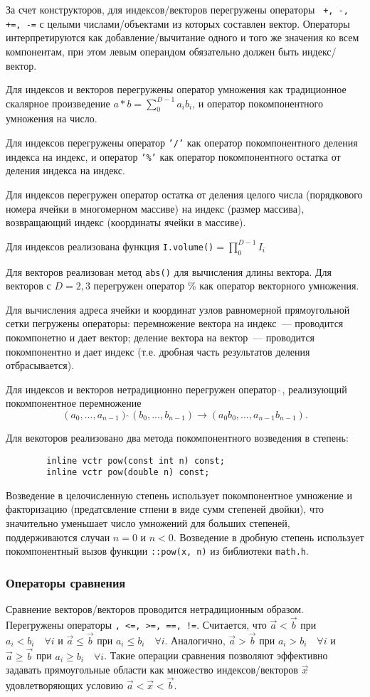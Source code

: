 За счет конструкторов, для индексов/векторов перегружены операторы {\tt
  +, -, +=, -=} с целыми  числами/объектами из которых составлен вектор. Операторы интерпретируются как
добавление/вычитание одного и того же значения ко всем компонентам, при этом левым операндом обязательно должен быть индекс/вектор.

Для индексов и векторов перегружены оператор умножения как традиционное
скалярное произведение {\tt $a\ast
  b=\sum_{0}^{D-1} a_ib_i$}, и оператор покомпонентного умножения на число. 

Для индексов перегружены оператор {\tt '/'} как оператор покомпонентного деления индекса на индекс, и
оператор {\tt '\%'} как оператор покомпонентного остатка от деления индекса на индекс.

Для индексов перегружен оператор остатка от деления целого числа (порядкового номера
ячейки в многомерном массиве) на индекс
(размер массива), возвращающий индекс (координаты ячейки в массиве).

Для индексов реализована функция {\tt I.volume()$=\prod_{0}^{D-1} I_i$}

Для векторов реализован метод {\tt abs()} для вычисления
длины вектора. Для векторов с $D=2,3$ перегружен оператор \% как оператор
векторного умножения. 

Для вычисления адреса ячейки и координат узлов
равномерной прямоугольной сетки  пегружены операторы:
перемножение вектора на индекс~---
проводится покомпонетно и дает вектор; деление вектора на вектор~---
проводится покомпонентно и дает индекс (т.е. дробная часть результатов деления
отбрасывается). 

Для индексов и векторов нетрадиционно перегружен оператор $\widehat{~}$, 
реализующий покомпонентное перемножение
$$(a_0,...,a_{n-1})\widehat{~}(b_0,...,b_{n-1}) \to (a_0b_0,...,a_{n-1}b_{n-1}).$$

Для векоторов реализовано два метода покомпонентного возведения в степень:
\begin{verbatim}
		inline vctr pow(const int n) const;
		inline vctr pow(double n) const;
\end{verbatim}
Возведение в целочисленную степень использует покомпонентное умножение и факторизацию (предатсвление стпени в виде сумм степеней двойки),
что значительно уменьшает число умножений для больших степеней, поддерживаются случаи $n=0$ и $n<0$. 
Возведение в дробную степень использует покомпонентный вызов функции \verb'::pow(x, n)' 
из библиотеки \verb'math.h'.

\subsubsection{Операторы сравнения}
Сравнение векторов/векторов проводится нетрадиционным образом. Перегружены операторы
{\tt <, >, <=, >=, ==,
  !=}. Считается, что $\vec a<\vec b$ при
$a_i<b_i\quad \forall i$ и $\vec a \leq \vec b$ при
$a_i\leq b_i\quad \forall i$. Аналогично, $\vec a>\vec b$ при
$a_i>b_i\quad \forall i$ и $\vec a \geq \vec b$ при
$a_i\geq b_i\quad \forall i$. Такие операции сравнения позволяют эффективно
задавать прямоугольные области как множество индексов/векторов $\vec x$ удовлетворяющих
условию $\vec a < \vec x < \vec b$.

